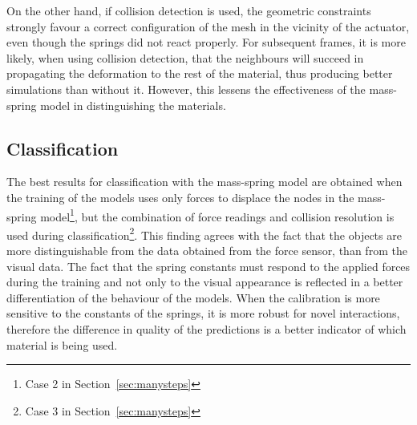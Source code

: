 \documentclass[journal]{IEEEtran}
\newcommand{\sref}[1]{Section~\ref{#1}}
\begin{document}
On the other hand, if collision detection is used, the geometric constraints strongly favour a correct configuration of the mesh in the vicinity of the actuator, even though the springs did not react properly.  For subsequent frames, it is more likely, when using collision detection, that the neighbours will succeed in propagating the deformation to the rest of the material, thus producing better simulations than without it.  However, this lessens the effectiveness of the mass-spring model in distinguishing the materials.

\subsection{Classification}
The best results for classification with the mass-spring model are obtained when the training of the models uses only forces to displace the nodes in the mass-spring model\footnote{Case 2 in \sref{sec:manysteps}}, but the combination of force readings and collision resolution is used during classification\footnote{Case 3 in \sref{sec:manysteps}}.  This finding agrees with the fact that the objects are more distinguishable from the data obtained from the force sensor, than from the visual data.  The fact that the spring constants must respond to the applied forces during the training and not only to the visual appearance is reflected in a better differentiation of the behaviour of the models.  When the calibration is more sensitive to the constants of the springs, it is more robust for novel interactions, therefore the difference in quality of the predictions is a better indicator of which material is being used.
\end{document}
